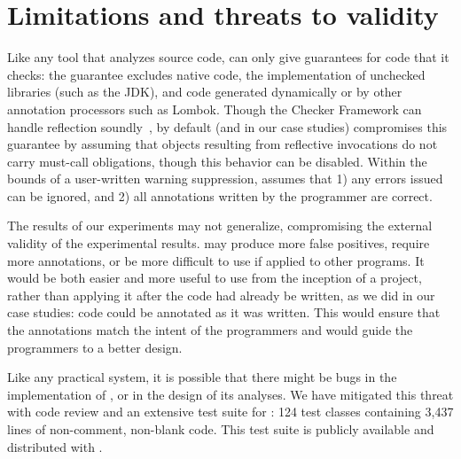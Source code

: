 \section{Limitations and threats to validity}
\label{sec:threats}

Like any tool that analyzes source code, \Tool can only
give guarantees for code that it checks: the guarantee
excludes native code, the implementation of unchecked libraries (such as the JDK),
and code generated dynamically or by other annotation processors
such as Lombok. Though the Checker Framework can handle
reflection soundly~\cite{BarrosJMVDdAE2015}, by default (and in our case studies)
\Tool compromises this guarantee
by assuming that objects resulting from reflective invocations
do not carry must-call obligations, though this behavior can
be disabled.
Within the bounds
of a user-written warning suppression, \Tool assumes that 1)
any errors issued can be ignored, and 2) all annotations
written by the programmer are correct.

The results of our experiments may not generalize, compromising the
external validity of the experimental results.
\Tool may produce more false positives, require
more annotations, or be more difficult to use if applied to other
programs.  It would be both easier and more useful to use \Tool from
the inception of a project, rather than applying it after the code had
already be written, as we did in our case studies: code could be
annotated as it was written.  This would ensure that the annotations match
the intent of the programmers and would guide the programmers to a better design.

Like any practical system, it is possible that there might
be bugs in the implementation of \Tool, or in the design of
its analyses. We have mitigated this threat with code review and an extensive
test suite for \Tool:
124 test classes containing
3,437 lines of non-comment, non-blank code.
This test suite is publicly available and distributed with \Tool.
